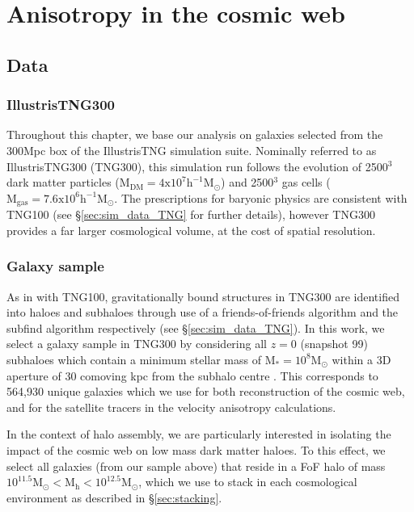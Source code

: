 \section{Anisotropy in the cosmic web} \label{sec:dyn_mod_aniso}
\subsection{Data}
\subsubsection{IllustrisTNG300}
Throughout this chapter, we base our analysis on galaxies selected from the 300Mpc box of the IllustrisTNG simulation suite. Nominally referred to as IllustrisTNG300 (TNG300), this simulation run follows the evolution of 2500$^3$ dark matter particles ($\mathrm{M_{DM} = 4 x 10^{7}h^{-1}M_{\odot}}$) and 2500$^3$ gas cells ($\mathrm{M_{gas} = 7.6 x 10^{6}h^{-1}M_{\odot}}$. The prescriptions for baryonic physics are consistent with TNG100 (see \S\ref{sec:sim_data_TNG} for further details), however TNG300 provides a far larger cosmological volume, at the cost of spatial resolution.

\subsubsection{Galaxy sample} \label{sec:gal_samp}
As in with TNG100, gravitationally bound structures in TNG300 are identified into haloes and subhaloes through use of a friends-of-friends algorithm \citep{davis85} and the subfind algorithm \citep{springel01} respectively (see \S\ref{sec:sim_data_TNG}). In this work, we select a galaxy sample in TNG300 by considering all $z=0$ (snapshot 99) subhaloes which contain a minimum stellar mass of $\mathrm{M_{\ast} = 10^{8} M_{\odot}}$ within a 3D aperture of 30 comoving kpc from the subhalo centre \citep[as defined in;][]{pillepich18b}. This corresponds to 564,930 unique galaxies which we use for both reconstruction of the cosmic web, and for the satellite tracers in the velocity anisotropy calculations.

In the context of halo assembly, we are particularly interested in isolating the impact of the cosmic web on low mass dark matter haloes. To this effect, we select all galaxies (from our sample above) that reside in a FoF halo of mass $\mathrm{10^{11.5} M_{\odot} < M_{h} < 10^{12.5} M_{\odot}}$, which we use to stack in each cosmological environment as described in \S\ref{sec:stacking}. 

